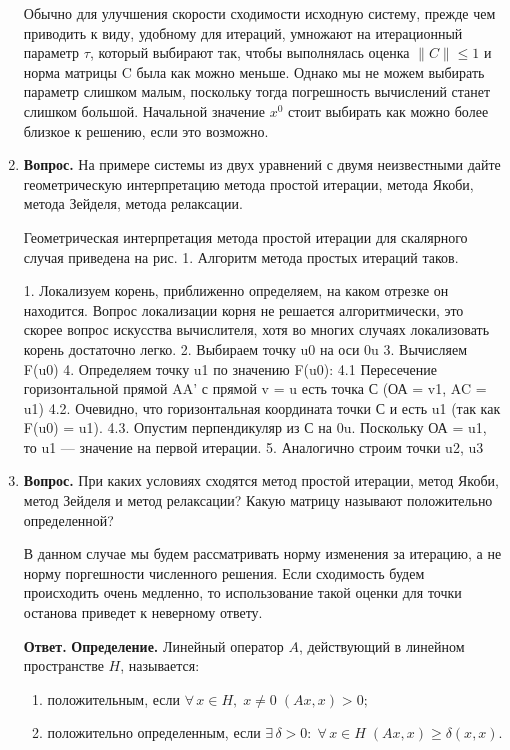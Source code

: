 \documentclass[12pt, a4paper]{article}
\begin{document}
\begin{enumerate}
	 	Обычно для улучшения скорости сходимости исходную систему,
	 	прежде чем приводить к виду, удобному для итераций, умножают
	 	на итерационный параметр $\tau$, который выбирают так, чтобы
	 	выполнялась оценка $\|C\| \leq 1$ и норма матрицы C была как можно
	 	меньше. Однако мы не можем выбирать параметр слишком малым, поскольку тогда погрешность вычислений станет слишком большой. Начальной значение $x^0$ стоит выбирать как можно более близкое к решению, если это возможно.
	 	
		\item  \textbf{Вопрос.} На примере системы из двух уравнений с двумя неизвестными дайте геометрическую интерпретацию метода простой итерации, метода Якоби, метода Зейделя, метода релаксации.
		
		Геометрическая интерпретация метода простой итерации для скалярного случая   приведена на рис. 1. Алгоритм метода простых итераций таков.
		
		1. Локализуем корень, приближенно определяем, на каком отрезке он находится. Вопрос локализации корня не решается алгоритмически, это скорее вопрос искусства вычислителя, хотя во многих случаях локализовать корень достаточно легко.
		2. Выбираем точку u0 на оси 0u
		3. Вычисляем F(u0)
		4. Определяем точку u1 по значению F(u0):
		4.1 Пересечение горизонтальной прямой AA’ с прямой v = u есть точка С (ОА = v1, AC = u1)
		4.2. Очевидно, что горизонтальная координата точки С и есть u1 (так как F(u0) = u1).
		4.3. Опустим перпендикуляр из С на 0u. Поскольку ОА = u1, то u1 — значение на первой итерации.
		5. Аналогично строим точки u2, u3
		
	\item  \textbf{Вопрос.} При каких условиях сходятся метод простой итерации, метод Якоби, метод Зейделя и метод релаксации? Какую матрицу называют положительно определенной?
	
	В данном случае мы будем рассматривать норму изменения за итерацию, а не норму поргешности численного решения. Если сходимость будем происходить очень медленно, то использование такой оценки для точки останова приведет к неверному ответу.
	
	\textbf{Ответ.}
	 \textbf{Определение.} Линейный оператор $ A $, действующий в линейном пространстве $ H $, называется:
	\begin{enumerate}
		\item положительным, если $ \forall \, x \in H, \; x \ne 0 \; (Ax,x) > 0; $
		\item положительно определенным, если $ \exists \, \delta > 0: \; \forall \, x \in H \; (Ax,x) \geq \delta (x,x)$.
	\end{enumerate}
\medskip


\end{enumerate}
\end{document}
